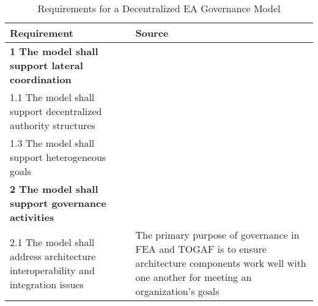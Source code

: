 \begin{table}
\caption{Requirements for a Decentralized EA Governance Model}
\label{table:requirements}
\begin{tabular}{ | p{} | p{} |}
%
\hline
%
\textbf{Requirement} & 
\textbf{Source}  \\
%
\hline
%
\textbf{1 The model shall support lateral coordination} & \\
%
%
1.1 The model shall support decentralized authority structures & 
\cite{Weill2004,pearlson2009,robbins1997,Camarinha-Matos2005} \\
%
%
%
1.3 The model shall support heterogeneous goals & 
\cite{Camarinha-Matos2005} \\
%
%
%
\hline
%
\textbf{2 The model shall support governance activities}  & 
 \\
%
%
2.1 The model shall address architecture interoperability and integration issues &
The primary purpose of governance in FEA \cite[Sec. 2]{FEA_PMO2007} and TOGAF \cite[Ch. 50]{togaf9.1} is to ensure architecture components work well with one another for meeting an organization's goals \\
%
%
%
%
\hline
%
\end{tabular}
\end{table}

%
%

